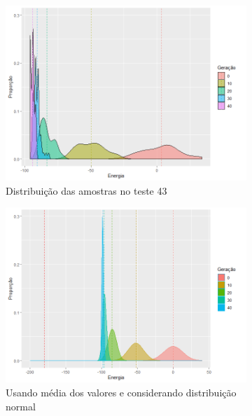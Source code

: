 \begin{figure}[h!]
	\centering
	\begin{subfigure}[b]{0.47\linewidth}
		\includegraphics[width=\linewidth]{imagens/distribuicao_t43_2.png}
		\caption{Distribuição das amostras no teste 43}
	\end{subfigure}
	\begin{subfigure}[b]{0.47\linewidth}
		\includegraphics[width=\linewidth]{imagens/Distribuicao_medias2.png}
		\caption{Usando média dos valores e considerando distribuição normal}
	\end{subfigure}
	\begin{subfigure}[b]{0.67\linewidth}

\end{subfigure}
\end{figure}
